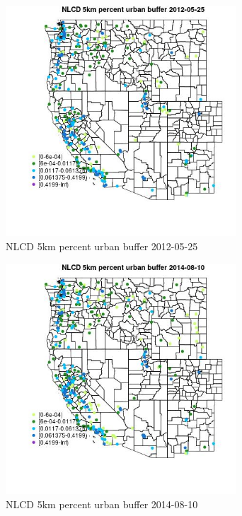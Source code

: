 \begin{figure} 
\centering  
\includegraphics[width=0.77\textwidth]{Code_Outputs/Report_ML_input_PM25_Step4_part_e_de_duplicated_aves_compiled_2019-05-18wNAs_MapObsNLCD_5km_percent_urban_buffer2012-05-25.jpg} 
\caption{\label{fig:Report_ML_input_PM25_Step4_part_e_de_duplicated_aves_compiled_2019-05-18wNAsMapObsNLCD_5km_percent_urban_buffer2012-05-25}NLCD 5km percent urban buffer 2012-05-25} 
\end{figure} 
 

\clearpage 

\begin{figure} 
\centering  
\includegraphics[width=0.77\textwidth]{Code_Outputs/Report_ML_input_PM25_Step4_part_e_de_duplicated_aves_compiled_2019-05-18wNAs_MapObsNLCD_5km_percent_urban_buffer2014-08-10.jpg} 
\caption{\label{fig:Report_ML_input_PM25_Step4_part_e_de_duplicated_aves_compiled_2019-05-18wNAsMapObsNLCD_5km_percent_urban_buffer2014-08-10}NLCD 5km percent urban buffer 2014-08-10} 
\end{figure} 
 

